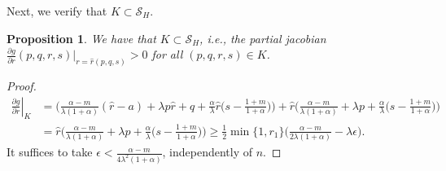 \documentclass[11pt]{article}
\newtheorem{proposition}{Proposition}[section]
\theoremstyle{remark}
\begin{document}
Next, we verify that $K\subset \mathcal{S}_H$.
\begin{proposition}
We have that $K\subset \mathcal{S}_H$, i.e., the partial jacobian $\frac{\partial g}{\partial r}(p,q,r,s)|_{r=\hat{r}(p,q,s)} >0 $ for all $(p,q,r,s)\in K$. %
\end{proposition}
\begin{proof}
 \begin{align*}
 \left.\frac{\partial g}{\partial r}\right|_{K} &= \Big(\frac{\alpha-m}{\lambda(1+\alpha)}(\hat{r}-a) + \lambda p\hat{r} + q +\frac{\alpha}{\lambda}\hat{r}\big(s- \frac{1+m}{1+\alpha}\big)\Big) + \hat{r}\Big(\frac{\alpha-m}{\lambda(1+\alpha)} + \lambda p + \frac{\alpha}{\lambda}\big(s- \frac{1+m}{1+\alpha}\big)\Big)\\
 &= \hat{r}\Big(\frac{\alpha-m}{\lambda(1+\alpha)} + \lambda p + \frac{\alpha}{\lambda}\big(s- \frac{1+m}{1+\alpha}\big) \Big)\ge \frac{1}{2}\min\{1,r_1\}\Big(\frac{\alpha-m}{2\lambda(1+\alpha)} - \lambda \epsilon\Big).
 \end{align*}
 It suffices to take $\epsilon < \frac{\alpha-m}{4\lambda^2(1+\alpha)}$, independently of $n$.
\end{proof}
\end{document}

